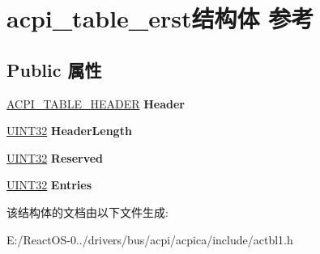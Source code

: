 \hypertarget{structacpi__table__erst}{}\section{acpi\+\_\+table\+\_\+erst结构体 参考}
\label{structacpi__table__erst}
\subsection*{Public 属性}
\begin{DoxyCompactItemize}
\item 
\mbox{\label{structacpi__table__erst_a9023d4a06decc0d49bed075d948e74db}} 
\hyperlink{structacpi__table__header}{A\+C\+P\+I\+\_\+\+T\+A\+B\+L\+E\+\_\+\+H\+E\+A\+D\+ER} {\bfseries Header}
\item 
\mbox{\label{structacpi__table__erst_a8f8d15fb7f7ee991dea8c9cfd2e657a9}} 
\hyperlink{_processor_bind_8h_ae1e6edbbc26d6fbc71a90190d0266018}{U\+I\+N\+T32} {\bfseries Header\+Length}
\item 
\mbox{\label{structacpi__table__erst_aa46f601ef3515a13da3216e42ad215da}} 
\hyperlink{_processor_bind_8h_ae1e6edbbc26d6fbc71a90190d0266018}{U\+I\+N\+T32} {\bfseries Reserved}
\item 
\mbox{\label{structacpi__table__erst_a52a80749a1c1072168a1ec3b7558139d}} 
\hyperlink{_processor_bind_8h_ae1e6edbbc26d6fbc71a90190d0266018}{U\+I\+N\+T32} {\bfseries Entries}
\end{DoxyCompactItemize}


该结构体的文档由以下文件生成\+:\begin{DoxyCompactItemize}
\item 
E\+:/\+React\+O\+S-\/0../drivers/bus/acpi/acpica/include/actbl1.\+h\end{DoxyCompactItemize}
